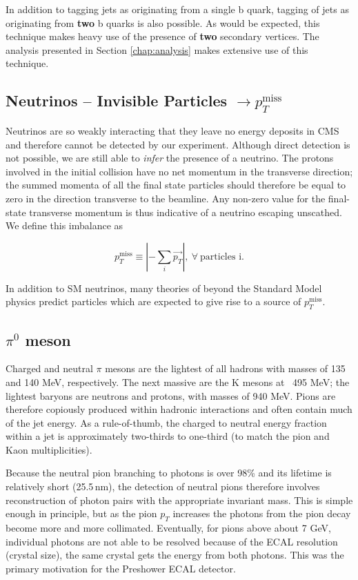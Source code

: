 In addition to tagging jets as originating from a single b quark, tagging of jets as originating from \textbf{two} b quarks is also possible.\cite{bbtagger} As would be expected, this technique makes heavy use of the presence of \textbf{two} secondary vertices. The analysis presented in Section \ref{chap:analysis} makes extensive use of this technique.

\subsection{Neutrinos -- Invisible Particles $\rightarrow p_{T}^{\mathrm{miss}}$}

Neutrinos are so weakly interacting that they leave no energy deposits in CMS and therefore cannot be detected by our experiment. Although direct detection is not possible, we are still able to \textit{infer} the presence of a neutrino. The protons involved in the initial collision have no net momentum in the transverse direction; the summed momenta of all the final state particles should therefore be equal to zero in the direction transverse to the beamline. Any non-zero value for the final-state transverse momentum is thus indicative of a neutrino escaping unscathed. We define this imbalance as 

\begin{equation}
p_{T}^{\mathrm{miss}}  \equiv \left | - \sum_{i} \vec{p_{T}} \right |,~\forall~\textrm{particles~i}.
\end{equation}

In addition to SM neutrinos, many theories of beyond the Standard Model physics predict particles which are expected to give rise to a source of $p_{T}^{\mathrm{miss}}$.

\subsection{$\pi^{0}$ meson}

Charged and neutral $\pi$ mesons are the lightest of all hadrons with masses of 135 and 140 MeV, respectively. The next massive are the K mesons at ~495 MeV; the lightest baryons are neutrons and protons, with masses of 940 MeV. Pions are therefore copiously produced within hadronic interactions and often contain much of the jet energy. As a rule-of-thumb, the charged to neutral energy fraction within a jet is approximately two-thirds to one-third (to match the pion and Kaon multiplicities).

Because the neutral pion branching to photons is over 98\% and its lifetime is relatively short (25.5$\,$nm), the detection of neutral pions therefore involves reconstruction of photon pairs with the appropriate invariant mass. This is simple enough in principle, but as the pion $p_{T}$ increases the photons from the pion decay become more and more collimated. Eventually, for pions above about 7 GeV, individual photons are not able to be resolved because of the ECAL resolution (crystal size), the same crystal gets the energy from both photons. This was the primary motivation for the Preshower ECAL detector.
